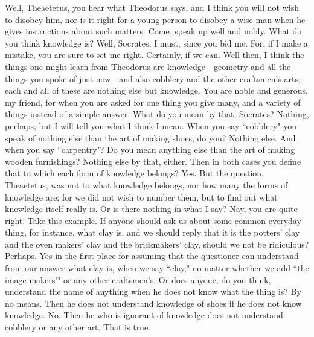 \documentclass[letterpaper,12pt]{article}
\newcommand{\stephpag}[1]{\marginnote{\small\itshape\fontfamily{ppl}\selectfont #1}}
\begin{document}
\begin{drama}
\socratesspeaks
Well, Theaetetus, you hear what Theodorus says, \stephpag{c} and I think you will not wish to disobey him, nor is it right for a young person to disobey a wise man when he gives instructions about such matters. Come, speak up well and nobly. What do you think knowledge is?
\theaetetusspeaks
Well, Socrates, I must, since you bid me. For, if I make a mistake, you are sure to set me right.
\socratesspeaks
Certainly, if we can.
\theaetetusspeaks
Well then, I think the things one might learn from Theodorus are knowledge—geometry and all the things you spoke of just now—and also cobblery and \stephpag{d} the other craftsmen's arts; each and all of these are nothing else but knowledge.
\socratesspeaks
You are noble and generous, my friend, for when you are asked for one thing you give many, and a variety of things instead of a simple answer.
\theaetetusspeaks
What do you mean by that, Socrates?
\socratesspeaks
Nothing, perhaps; but I will tell you what I think I mean. When you say ``cobblery" you speak of nothing else than the art of making shoes, do you?
\theaetetusspeaks
Nothing else. \stephpag{e}
\socratesspeaks
And when you say ``carpentry"? Do you mean anything else than the art of making wooden furnishings?
\theaetetusspeaks
Nothing else by that, either.
\socratesspeaks
Then in both cases you define that to which each form of knowledge belongs?
\theaetetusspeaks
Yes.
\socratesspeaks
But the question, Theaetetus, was not to what knowledge belongs, nor how many the forms of knowledge are; for we did not wish to number them, but to find out what knowledge itself really is. Or is there nothing in what I say?
\theaetetusspeaks
Nay, you are quite right. \stephpag{147 a}
\socratesspeaks
Take this example. If anyone should ask us about some common everyday thing, for instance, what clay is, and we should reply that it is the potters' clay and the oven makers' clay and the brickmakers' clay, should we not be ridiculous?
\theaetetusspeaks
Perhaps.
\socratesspeaks
Yes in the first place for assuming that the questioner can understand from our answer what clay is, when we say ``clay," no matter whether we add ``the image-makers'" \stephpag{b} or any other craftsmen's. Or does anyone, do you think, understand the name of anything when he does not know what the thing is?
\theaetetusspeaks
By no means.
\socratesspeaks
Then he does not understand knowledge of shoes if he does not know knowledge.
\theaetetusspeaks
No.
\socratesspeaks
Then he who is ignorant of knowledge does not understand cobblery or any other art.
\theaetetusspeaks
That is true.
\socratesspeaks

\end{drama}
\end{document}
